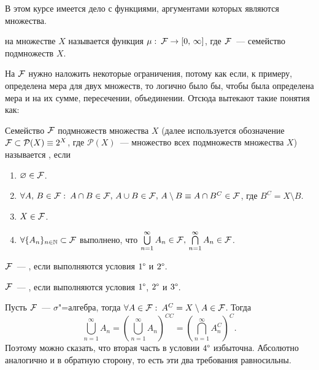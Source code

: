 \newpage
{}

В этом курсе имеется дело с функциями, аргументами которых являются множества.
\begin{definition}
	 на множестве $X$ называется функция
	$\mu:\: \mathcal{F}  \rightarrow [0,\, \infty]$, где $\mathcal{F} $~--- семейство подмножеств $X$.
\end{definition}

На $\mathcal{F} $ нужно наложить некоторые ограничения, потому как если, к примеру, определена мера для двух множеств,
то логично было бы, чтобы была определена мера и на их сумме, пересечении, объединении. Отсюда вытекают такие понятия как:

\begin{definition}
	Семейство $\mathcal{F} $ подмножеств множества $X$ (далее используется обозначение $\mathcal{F}  \subset \mathcal{P} (X)\equiv 2^{X}$, где
	$\mathcal{P} (X)$~--- множество всех подмножеств множества $X$) называется , если
	\begin{enumerate}[label=\arabic*\degree.]
		\item $\varnothing\in \mathcal{F} $.
		\item $\forall A,\, B\in\mathcal{F} :\: A\cap B\in\mathcal{F} ,\,A\cup B\in\mathcal{F} ,\, A\setminus B\equiv A\cap B^C\in\mathcal{F} $, где
		      $B^C=X\setminus B$.
		\item $X\in\mathcal{F} $.
		\item $\forall \{A_n\}_{n\in\mathbb{N}}\subset\mathcal{F} $ выполнено, что
		      $\bigcup\limits_{n=1}^{\infty}A_n\in\mathcal{F} ,\,\bigcap\limits_{n=1}^{\infty}A_n\in\mathcal{F} $.
	\end{enumerate}
\end{definition}

\begin{definition}
	$\mathcal{F} $~--- , если выполняются условия $1\degree$ и $2\degree$.
\end{definition}
\begin{definition}
	$\mathcal{F} $~--- , если выполняются условия $1\degree$, $2\degree$ и $3\degree$.
\end{definition}

\begin{remark}
	Пусть $\mathcal{F} $~--- $\sigma$"=алгебра, тогда $\forall A\in\mathcal{F} :\: A^C=X\setminus A\in\mathcal{F} $. Тогда
	\[
		\bigcup\limits_{n=1}^{\infty}A_n=\left(\bigcup\limits_{n=1}^{\infty}A_n\right)^{CC}=
		\left(\bigcap\limits_{n=1}^{\infty}A_n^C\right)^C.
	\]
	Поэтому можно сказать, что вторая часть в условии $4\degree$ избыточна. Абсолютно аналогично и в обратную сторону,
	то есть эти два требования равносильны.
	\label{lect1remark1}
\end{remark}

